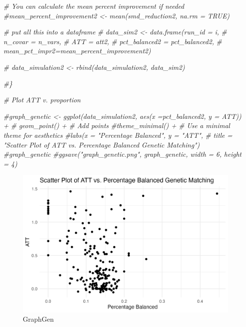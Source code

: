 \documentclass[
]{article}
\newenvironment{Shaded}{\begin{snugshade}}{\end{snugshade}}
\newcommand{\CommentTok}[1]{\textcolor[rgb]{0.56,0.35,0.01}{\textit{#1}}}
\begin{document}
\begin{Shaded}
\begin{Highlighting}[]
\CommentTok{\# You can calculate the mean percent improvement if needed}
\CommentTok{\#mean\_percent\_improvement2 \textless{}{-} mean(smd\_reduction2, na.rm = TRUE)}



  \CommentTok{\# put all this into a dataframe}
\CommentTok{\#  data\_sim2 \textless{}{-} data.frame(run\_id = i,}
 \CommentTok{\#                         n\_covar = n\_vars,}
 \CommentTok{\#                         ATT = att2,}
 \CommentTok{\#                         pct\_balanced2 = pct\_balanced2, }
 \CommentTok{\#                         mean\_pct\_impr2=mean\_percent\_improvement2)}

\CommentTok{\#  data\_simulation2 \textless{}{-} rbind(data\_simulation2, data\_sim2)}

\CommentTok{\#\}}
\end{Highlighting}
\end{Shaded}

\begin{Shaded}
\begin{Highlighting}[]
\CommentTok{\# Plot ATT v. proportion}

\CommentTok{\#graph\_genetic \textless{}{-} ggplot(data\_simulation2, aes(x =pct\_balanced2, y = ATT)) + }
 \CommentTok{\# geom\_point() +  \# Add points}
  \CommentTok{\#theme\_minimal() +  \# Use a minimal theme for aesthetics}
  \CommentTok{\#labs(x = "Percentage Balanced", y = "ATT", }
   \CommentTok{\#    title = "Scatter Plot of ATT vs. Percentage Balanced Genetic Matching")}
\CommentTok{\#graph\_genetic }
\CommentTok{\#ggsave("graph\_genetic.png", graph\_genetic, width = 6, height = 4)}
\end{Highlighting}
\end{Shaded}

\begin{figure}
\centering
\includegraphics{graph_genetic.png}
\caption{GraphGen}
\end{figure}
\end{document}
